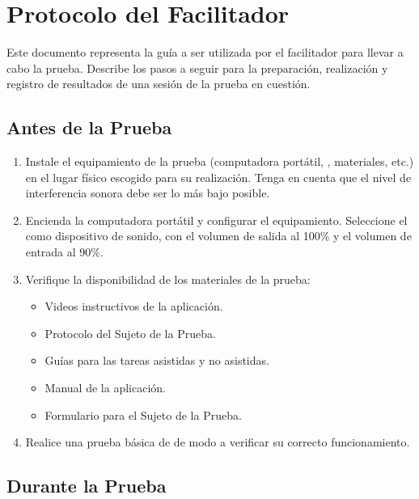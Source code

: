 \section{Protocolo del Facilitador}

Este documento representa la gu\'ia a ser utilizada por el facilitador para llevar a cabo la
prueba. Describe los pasos a seguir para la preparaci\'on, realizaci\'on y registro de resultados de una sesi\'on de la prueba en cuesti\'on.

\subsection{Antes de la Prueba}

\begin{enumerate}
    \item Instale el equipamiento de la prueba (computadora port\'atil, , materiales, 
    etc.) en el lugar f\'isico escogido para su realizaci\'on. Tenga en cuenta que el nivel de
    interferencia sonora debe ser lo m\'as bajo posible.
    \item Encienda la computadora port\'atil y configurar el equipamiento. Seleccione el  como dispositivo de sonido, con el volumen de salida al 100\% y el 
    volumen de entrada al 90\%.
    \item Verifique la disponibilidad de los materiales de la prueba:
    \begin{itemize}
        \item Videos instructivos de la aplicaci\'on.
        \item Protocolo del Sujeto de la Prueba.
        \item Gu\'ias para las tareas asistidas y no asistidas.
        \item Manual de la aplicaci\'on.
        \item Formulario para el Sujeto de la Prueba.
    \end{itemize}
    \item Realice una prueba b\'asica de  de modo a verificar su 
    correcto funcionamiento. 
\end{enumerate}

\subsection{Durante la Prueba}

